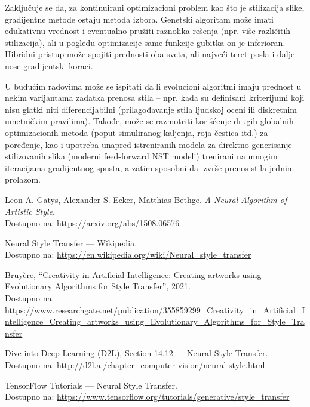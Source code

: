 \documentclass[a4paper,12pt]{article}
\begin{document}
Zaključuje se da, za kontinuirani optimizacioni problem kao što je stilizacija slike, gradijentne metode ostaju metoda izbora. Genetski algoritam može imati edukativnu vrednost i eventualno pružiti raznolika rešenja (npr. više različitih stilizacija), ali u pogledu optimizacije same funkcije gubitka on je inferioran. Hibridni pristup može spojiti prednosti oba sveta, ali najveći teret posla i dalje nose gradijentski koraci.

U budućim radovima može se ispitati da li evolucioni algoritmi imaju prednost u nekim varijantama zadatka prenosa stila – npr. kada su definisani kriterijumi koji nisu glatki niti diferencijabilni (prilagođavanje stila ljudskoj oceni ili diskretnim umetničkim pravilima). Takođe, može se razmotriti korišćenje drugih globalnih optimizacionih metoda (poput simuliranog kaljenja, roja čestica itd.) za poređenje, kao i upotreba unapred istreniranih modela za direktno generisanje stilizovanih slika (moderni feed-forward NST modeli) trenirani na mnogim iteracijama gradijentnog spusta, a zatim sposobni da izvrše prenos stila jednim prolazom.

\newpage

\begin{thebibliography}{99}

Leon A. Gatys, Alexander S. Ecker, Matthias Bethge. 
\textit{A Neural Algorithm of Artistic Style}.\\
Dostupno na: \href{https://arxiv.org/abs/1508.06576}{https://arxiv.org/abs/1508.06576}

Neural Style Transfer — Wikipedia.\\
Dostupno na: \href{https://en.wikipedia.org/wiki/Neural_style_transfer}{https://en.wikipedia.org/wiki/Neural\_style\_transfer}

Bruyère, “Creativity in Artificial Intelligence: Creating artworks using Evolutionary Algorithms for Style Transfer”, 2021.\\
Dostupno na: \href{https://www.researchgate.net/publication/355859299_Creativity_in_Artificial_Intelligence_Creating_artworks_using_Evolutionary_Algorithms_for_Style_Transfer}{https://www.researchgate.net/publication/355859299\_Creativity\_in\_Artificial\_Intelligence\_Creating\_artworks\_using\_Evolutionary\_Algorithms\_for\_Style\_Transfer}

Dive into Deep Learning (D2L), Section 14.12 — Neural Style Transfer.\\
Dostupno na: \href{http://d2l.ai/chapter_computer-vision/neural-style.html}{http://d2l.ai/chapter\_computer-vision/neural-style.html}

TensorFlow Tutorials — Neural Style Transfer.\\
Dostupno na: \href{https://www.tensorflow.org/tutorials/generative/style_transfer}{https://www.tensorflow.org/tutorials/generative/style\_transfer}

\end{thebibliography}
\end{document}
